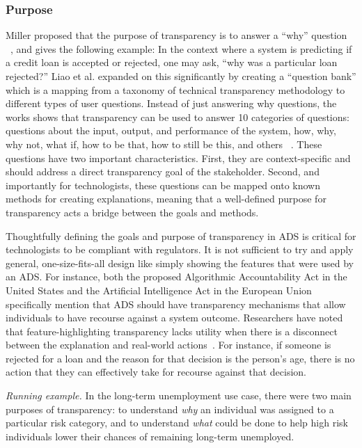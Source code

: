 
\subsubsection{Purpose} \label{purpose}  Miller proposed that the purpose of transparency is to answer a ``why'' question ~\cite{DBLP:journals/corr/Miller17a}, and gives the following example: In the context where a system is predicting if a credit loan is accepted or rejected, one may ask, ``why was a particular loan rejected?'' Liao et al. expanded on this significantly by creating a ``question bank'' which is a mapping from a taxonomy of technical transparency methodology to different types of user questions.  Instead of just answering why questions, the works shows that transparency can be used to answer 10 categories of questions:  questions about the input, output, and performance of the system, how, why, why not, what if, how to be that, how to still be this, and others ~\cite{DBLP:conf/chi/LiaoGM20}. These questions have two important characteristics. First, they are context-specific and should address a direct transparency goal of the stakeholder. Second, and importantly for technologists, these questions can be mapped onto known methods for creating explanations, meaning that a well-defined purpose for transparency acts a bridge between the goals and methods.

Thoughtfully defining the goals and purpose of transparency in ADS is critical for technologists to be compliant with regulators. It is not sufficient to try and apply general, one-size-fits-all design like simply showing the features that were used by an ADS. For instance, both the proposed Algorithmic Accountability Act in the United States and the Artificial Intelligence Act in the European Union specifically mention that ADS should have transparency mechanisms that allow individuals to have recourse against a system outcome. Researchers have noted that feature-highlighting transparency lacks utility when there is a disconnect between the explanation and real-world actions~\cite{barocas2020hidden}. For instance, if someone is rejected for a loan and the reason for that decision is the person's age, there is no action that they can effectively take for recourse against that decision.

\emph{Running example.} In the long-term unemployment use case, there were two main purposes of transparency: to understand \emph{why} an individual was assigned to a particular risk category, and to understand \emph{what} could be done to help high risk individuals lower their chances of remaining long-term unemployed.

